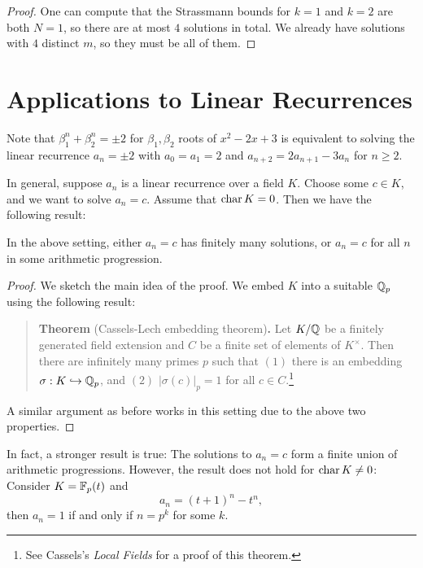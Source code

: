 \begin{proof}
  One can compute that the Strassmann bounds
  for $k = 1$ and $k = 2$ are both $N = 1$, so
  there are at most $4$ solutions in total.
  We already have solutions with
  $4$ distinct $m$, so they must be all of them.
\end{proof}

\section{Applications to Linear Recurrences}

\begin{remark}
  Note that $\beta_1^n + \beta_2^n = \pm 2$ for
  $\beta_1, \beta_2$ roots of $x^2 - 2x + 3$ is
  equivalent to solving the linear recurrence
  $a_n = \pm 2$ with $a_0 = a_1 = 2$ and
  $a_{n + 2} = 2a_{n + 1} - 3 a_n$ for $n \ge 2$.

  In general, suppose $a_n$ is a linear
  recurrence over a field $K$. Choose some
  $c \in K$, and we want to solve $a_n = c$.
  Assume that $\operatorname{char} K = 0$. Then we have the
  following result:
\end{remark}

\begin{theorem}
  In the above setting, either $a_n = c$ has
  finitely
  many solutions, or $a_n = c$ for all $n$ in
  some arithmetic progression.
\end{theorem}

\begin{proof}
  We sketch the main idea of the proof.
  We embed $K$ into a suitable $\mathbb{Q}_p$ using the
  following result:
  \begin{quote}
    \textbf{Theorem} (Cassels-Lech embedding theorem)\textbf{.}
    Let $K / \mathbb{Q}$ be a finitely generated field
    extension and $C$ be a finite set of
    elements of $K^\times$. Then there are
    infinitely many primes $p$ such that
    $(1)$ there is an embedding $\sigma : K \hookrightarrow \mathbb{Q}_p$,
    and $(2)$ $|\sigma(c)|_p = 1$ for all $c \in C$.\footnote{See Cassels's \emph{Local Fields} for a proof of this theorem.}
  \end{quote}
  A similar argument as before works in this
  setting due to the above two properties.
\end{proof}

\begin{remark}
  In fact, a stronger result is true:
  The solutions to $a_n = c$ form a finite
  union of arithmetic progressions.
  However, the result does not hold for
  $\operatorname{char} K \ne 0$: Consider $K = \mathbb{F}_p(t)$ and
  \[
    a_n = (t + 1)^n - t^n,
  \]
  then $a_n = 1$ if and only if $n = p^k$ for some
  $k$.
\end{remark}

